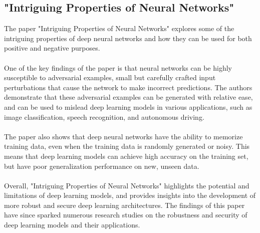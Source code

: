 \documentclass[paper=a4, fontsize=11pt]{scrartcl}
\numberwithin{equation}{section}		%
\numberwithin{figure}{section}			%
\numberwithin{table}{section}				%
\begin{document}
\subsection{"Intriguing Properties of Neural Networks" \cite{ Intriguing properties of neural networks}}
The paper "Intriguing Properties of Neural Networks" explores some of the intriguing properties of deep neural networks and how they can be used for both positive and negative purposes.
\\
\\
One of the key findings of the paper is that neural networks can be highly susceptible to adversarial examples, small but carefully crafted input perturbations that cause the network to make incorrect predictions. The authors demonstrate that these adversarial examples can be generated with relative ease, and can be used to mislead deep learning models in various applications, such as image classification, speech recognition, and autonomous driving.
\\
\\
The paper also shows that deep neural networks have the ability to memorize training data, even when the training data is randomly generated or noisy. This means that deep learning models can achieve high accuracy on the training set, but have poor generalization performance on new, unseen data.
\\
\\
Overall, "Intriguing Properties of Neural Networks" highlights the potential and limitations of deep learning models, and provides insights into the development of more robust and secure deep learning architectures. The findings of this paper have since sparked numerous research studies on the robustness and security of deep learning models and their applications.
\end{document}
